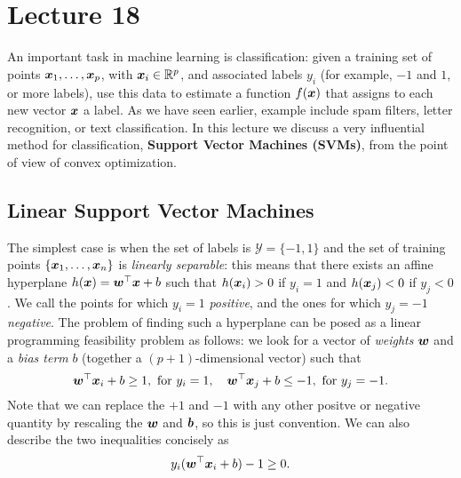 %
%
% 


\chapter*{Lecture 18}
\addtocounter{chapter}{18}
\addtocounter{section}{0}

An important task in machine learning is classification: given a training set of points $\bm{x}_1,\dots,\bm{x}_p$, with $\bm{x}_i\in \mathbb{R}^p$, and associated labels $y_i$ (for example, $-1$ and $1$, or more labels), use this data to estimate a function $f(\bm{x})$ that assigns to each new vector $\bm{x}$ a label. As we have seen earlier, example include spam filters, letter recognition, or text classification. In this lecture we discuss a very influential method for classification, \textbf{Support Vector Machines (SVMs)}, from the point of view of convex optimization.

\section{Linear Support Vector Machines}
The simplest case is when the set of labels is $\mathcal{Y}=\{-1,1\}$ and the set of training points $\{\bm{x}_1,\dots,\bm{x}_n\}$ is {\em linearly separable}: this means that there exists an affine hyperplane $h(\bm{x})=\bm{w}^{\top}\bm{x}+b$ such that $h(\bm{x}_i)>0$ if $y_i=1$ and $h(\bm{x}_j)<0$ if $y_j<0$. We call the points for which $y_i=1$ {\em positive}, and the ones for which $y_j=-1$ {\em negative}.
The problem of finding such a hyperplane can be posed as a linear programming feasibility problem as follows: we look for a vector of {\em weights} $\bm{w}$ and a {\em bias term} $b$ (together a $(p+1)$-dimensional vector) such that 
\begin{equation*}
  \bm{w}^{\top}\bm{x}_i+b\geq 1, \text{ for } y_i=1, \quad \bm{w}^{\top}\bm{x}_j+b\leq -1, \text{ for } y_j=-1.
\end{equation*}
Note that we can replace the $+1$ and $-1$ with any other positve or negative quantity by rescaling the $\bm{w}$ and $\bm{b}$, so this is just convention. We can also describe the two inequalities concisely as
\begin{equation}\label{eq:sephyp}
  y_i(\bm{w}^{\top}\bm{x}_i+b)-1 \geq 0.
\end{equation}


